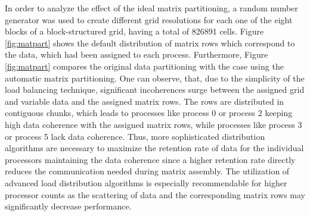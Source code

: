 In order to analyze the effect of the ideal matrix partitioning, a random number generator was used to create different grid resolutions for each one of the eight blocks of a block-structured grid, having a total of 826891 cells. Figure \ref{fig:matpart} shows the default distribution of matrix rows which correspond to the data, which had been assigned to each process. Furthermore, Figure \ref{fig:matpart} compares the original data partitioning with the case using the automatic matrix partitioning. One can observe, that, due to the simplicity of the load balancing technique, significant incoherences surge between the assigned grid and variable data and the assigned matrix rows. The rows are distributed in contiguous chunks, which leads to processes like process 0 or process 2 keeping high data coherence with the assigned matrix rows, while processes like process 3 or process 5 lack data coherence. Thus, more sophisticated distribution algorithms are necessary to maximize the retention rate of data for the individual processors maintaining the data coherence since a higher retention rate directly reduces the communication needed during matrix assembly. The utilization of advanced load distribution algorithms is especially recommendable for higher processor counts as the scattering of data and the corresponding matrix rows may significantly decrease performance.

